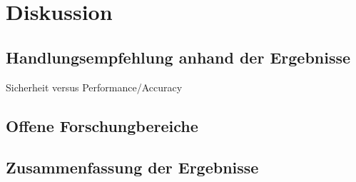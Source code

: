 \chapter{Diskussion}

\section{Handlungsempfehlung anhand der Ergebnisse}
Sicherheit versus Performance/Accuracy

\section{Offene Forschungbereiche}

\section{Zusammenfassung der Ergebnisse}